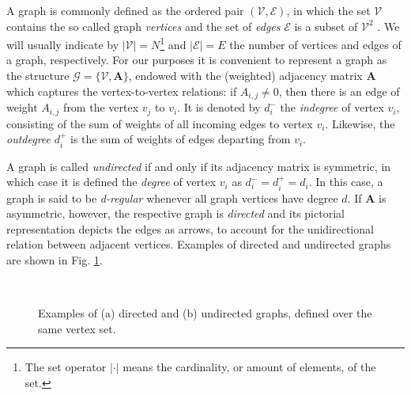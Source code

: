 A graph is commonly defined as the ordered pair  $ (\mathcal{V},\mathcal{E}) $, in which the set $ \mathcal{V} $ contains the so called graph \emph{vertices} and the set of \emph{edges} $ \mathcal{E} $ is a subset of $ \mathcal{V}^2 $ \cite{feofiloff2011introduccao}.  We will usually indicate by $ |\mathcal{V}| = N $\footnote{The set operator $ |\cdot| $ means the cardinality, or amount of elements, of the set.} and $ |\mathcal{E}| = E $ the number of vertices and edges of a graph, respectively. For our purposes it is convenient to represent a graph as the structure $ \mathcal{G} = \{\mathcal{V}, \mathbf{A}\} $, endowed with the (weighted) adjacency matrix $ \mathbf{A} $ which captures the vertex-to-vertex relations: if $ A_{i,j} \neq 0$, then there is an edge of weight $ A_{i,j} $ from the vertex $ v_j $ to $ v_i $. It is denoted by $ d_i^- $ the \emph{indegree} of vertex $ v_i $, consisting of the sum of weights of all incoming edges to vertex $ v_i $. Likewise, the \emph{outdegree} $ d^+_i $ is the sum of weights of edges departing from $ v_i $.

A graph is called \emph{undirected} if and only if its adjacency matrix is symmetric, in which case it is defined the \emph{degree} of vertex $ v_i $ as $ d_i^- = d_i^+ = d_i $. In this case, a graph is said to be \emph{d-regular} whenever all graph vertices have degree $ d $\label{pag:regular}. If $ \mathbf{A} $ is asymmetric, however, the respective graph is \emph{directed} and its pictorial representation depicts the edges as arrows, to account for the unidirectional relation between adjacent vertices. Examples of directed and undirected graphs are shown in Fig. \ref{fig:example_graphs}.

\begin{figure}
	\centering
	~
	\caption{Examples of (a) directed and (b) undirected graphs, defined over the same vertex set.}
	\label{fig:example_graphs}
\end{figure}

